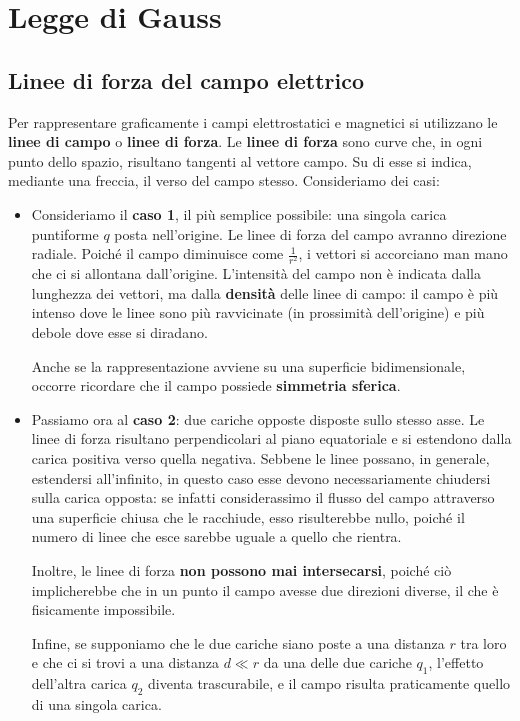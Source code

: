 \documentclass{book}
\begin{document}
\chapter{Legge di Gauss}
\section{Linee di forza del campo elettrico}

Per rappresentare graficamente i campi elettrostatici e magnetici si utilizzano le \textbf{linee di campo} o \textbf{linee di forza}.  
Le \textbf{linee di forza} sono curve che, in ogni punto dello spazio, risultano tangenti al vettore campo. Su di esse si indica, mediante una freccia, il verso del campo stesso. Consideriamo dei casi: 

\bigskip
\begin{itemize}
    \item 
Consideriamo il \textbf{caso 1}, il più semplice possibile: una singola carica puntiforme $q$ posta nell’origine.  
Le linee di forza del campo avranno direzione radiale. Poiché il campo diminuisce come $\frac{1}{r^2}$, i vettori si accorciano man mano che ci si allontana dall’origine.  
L’intensità del campo non è indicata dalla lunghezza dei vettori, ma dalla \textbf{densità} delle linee di campo: il campo è più intenso dove le linee sono più ravvicinate (in prossimità dell’origine) e più debole dove esse si diradano.  

Anche se la rappresentazione avviene su una superficie bidimensionale, occorre ricordare che il campo possiede \textbf{simmetria sferica}.  
\item
Passiamo ora al \textbf{caso 2}: due cariche opposte disposte sullo stesso asse.  
Le linee di forza risultano perpendicolari al piano equatoriale e si estendono dalla carica positiva verso quella negativa.  
Sebbene le linee possano, in generale, estendersi all’infinito, in questo caso esse devono necessariamente chiudersi sulla carica opposta: se infatti considerassimo il flusso del campo attraverso una superficie chiusa che le racchiude, esso risulterebbe nullo, poiché il numero di linee che esce sarebbe uguale a quello che rientra.  

Inoltre, le linee di forza \textbf{non possono mai intersecarsi}, poiché ciò implicherebbe che in un punto il campo avesse due direzioni diverse, il che è fisicamente impossibile.  

Infine, se supponiamo che le due cariche siano poste a una distanza $r$ tra loro e che ci si trovi a una distanza $d \ll r$ da una delle due cariche $q_1$, l’effetto dell’altra carica $q_2$ diventa trascurabile, e il campo risulta praticamente quello di una singola carica.  


\end{itemize}
\end{document}
